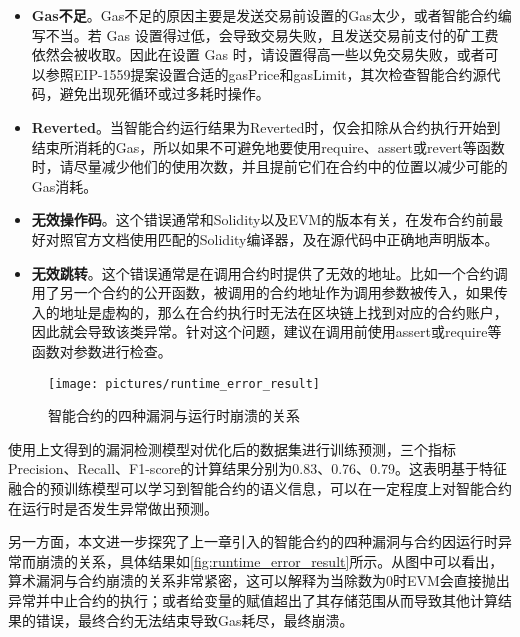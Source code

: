 \begin{itemize}
    \item \textbf{Gas不足}。Gas不足的原因主要是发送交易前设置的Gas太少，或者智能合约编写不当。若 Gas 设置得过低，会导致交易失败，且发送交易前支付的矿工费依然会被收取。因此在设置 Gas 时，请设置得高一些以免交易失败，或者可以参照EIP-1559提案\cite{EIP1559}设置合适的gasPrice和gasLimit，其次检查智能合约源代码，避免出现死循环或过多耗时操作。
    \item \textbf{Reverted}。当智能合约运行结果为Reverted时，仅会扣除从合约执行开始到结束所消耗的Gas，所以如果不可避免地要使用require、assert或revert等函数时，请尽量减少他们的使用次数，并且提前它们在合约中的位置以减少可能的Gas消耗。
    \item \textbf{无效操作码}。这个错误通常和Solidity以及EVM的版本有关，在发布合约前最好对照官方文档使用匹配的Solidity编译器，及在源代码中正确地声明版本。
    \item \textbf{无效跳转}。这个错误通常是在调用合约时提供了无效的地址。比如一个合约调用了另一个合约的公开函数，被调用的合约地址作为调用参数被传入，如果传入的地址是虚构的，那么在合约执行时无法在区块链上找到对应的合约账户，因此就会导致该类异常。针对这个问题，建议在调用前使用assert或require等函数对参数进行检查。
\end{itemize}


\begin{figure}[htbp]
    \centering
    \texttt{[image: pictures/runtime\_error\_result]}
    \caption{\label{fig:runtime_error_result}智能合约的四种漏洞与运行时崩溃的关系}
\end{figure}
使用上文得到的漏洞检测模型对优化后的数据集进行训练预测，三个指标Precision、Recall、F1-score的计算结果分别为0.83、0.76、0.79。这表明基于特征融合的预训练模型可以学习到智能合约的语义信息，可以在一定程度上对智能合约在运行时是否发生异常做出预测。

另一方面，本文进一步探究了上一章引入的智能合约的四种漏洞与合约因运行时异常而崩溃的关系，具体结果如\autoref{fig:runtime_error_result}所示。从图中可以看出，算术漏洞与合约崩溃的关系非常紧密，这可以解释为当除数为0时EVM会直接抛出异常并中止合约的执行；或者给变量的赋值超出了其存储范围从而导致其他计算结果的错误，最终合约无法结束导致Gas耗尽，最终崩溃。





